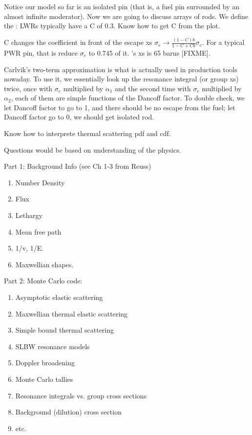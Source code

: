 \documentclass{school-22.211-notes}
\begin{document}
Notice our model so far is an isolated pin (that is, a fuel pin surrounded by an almost infinite moderator). Now we are going to discuss arrays of rods. We define the :
LWRs typically have a C of 0.3. Know how to get C from the plot. 


C changes the coefficient in front of the escape xs $\sigma_e \to \frac{(1-C)b}{1-C + Cb} \sigma_e$. For a typical PWR pin, that is reduce $\sigma_e$ to 0.745 of it. 's xs is 65 barns [FIXME].

Carlvik's two-term approximation is what is actually used in production tools nowaday. To use it, we essentially look up the resonance integral (or group xs) twice, once with $\sigma_e$ multiplied by $\alpha_1$ and the second time with $\sigma_e$ multiplied by $\alpha_2$, each of them are simple functions of the Dancoff factor. To double check, we let Dancoff factor to go to 1, and there should be no escape from the fuel; let Dancoff factor go to 0, we should get isolated rod. 







Know how to interprete thermal scattering pdf and cdf. 

Questions would be based on understanding of the physics. 

Part 1: Background Info (see Ch 1-3 from Reuss)
\begin{enumerate}
\item Number Density
\item Flux
\item Lethargy
\item Mean free path
\item 1/v, 1/E.
\item Maxwellian shapes.
\end{enumerate}


Part 2: Monte Carlo code:
\begin{enumerate}
\item Asymptotic elastic scattering
\item Maxwellian thermal elastic scattering
\item Simple bound thermal scattering
\item SLBW resonance models
\item Doppler broadening
\item Monte Carlo tallies
\item Resonance integrals vs. group cross sections
\item Background (dilution) cross section
\item etc. 
\end{enumerate}
\end{document}
